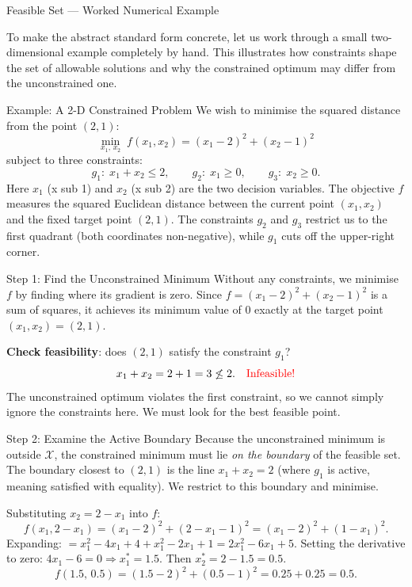 \documentclass[aspectratio=169,10pt]{beamer}
\begin{document}
\begin{frame}[allowframebreaks]{Feasible Set --- Worked Numerical Example}

To make the abstract standard form concrete, let us work through a small
two-dimensional example completely by hand.  This illustrates how constraints
shape the set of allowable solutions and why the constrained optimum may differ
from the unconstrained one.

  \begin{exampleblock}{Example: A 2-D Constrained Problem}
    We wish to minimise the squared distance from the point $(2, 1)$:
    \[
      \min_{x_1,\, x_2} \; f(x_1, x_2) = (x_1 - 2)^2 + (x_2 - 1)^2
    \]
    subject to three constraints:
    \[
      g_1:\; x_1 + x_2 \leq 2, \qquad
      g_2:\; x_1 \geq 0, \qquad
      g_3:\; x_2 \geq 0.
    \]
    Here $x_1$ (x sub 1) and $x_2$ (x sub 2) are the two decision variables.
    The objective $f$ measures the squared Euclidean distance between the
    current point $(x_1, x_2)$ and the fixed target point $(2, 1)$.
    The constraints $g_2$ and $g_3$ restrict us to the first quadrant (both
    coordinates non-negative), while $g_1$ cuts off the upper-right corner.
  \end{exampleblock}

  \begin{block}{Step 1: Find the Unconstrained Minimum}
    Without any constraints, we minimise $f$ by finding where its gradient
    is zero.  Since $f = (x_1-2)^2 + (x_2-1)^2$ is a sum of squares, it achieves
    its minimum value of $0$ exactly at the target point $(x_1, x_2) = (2, 1)$.

    \medskip
    \textbf{Check feasibility}: does $(2, 1)$ satisfy the constraint $g_1$?
    \[
      x_1 + x_2 = 2 + 1 = 3 \not\leq 2. \quad \text{\textcolor{red}{Infeasible!}}
    \]
    The unconstrained optimum violates the first constraint, so we cannot
    simply ignore the constraints here.  We must look for the best feasible point.
  \end{block}

  \begin{block}{Step 2: Examine the Active Boundary}
    Because the unconstrained minimum is outside $\mathcal{X}$, the constrained
    minimum must lie \emph{on the boundary} of the feasible set.  The boundary
    closest to $(2,1)$ is the line $x_1 + x_2 = 2$ (where $g_1$ is active,
    meaning satisfied with equality).  We restrict to this boundary and minimise.

    \medskip
    Substituting $x_2 = 2 - x_1$ into $f$:
    \[
      f(x_1, 2-x_1) = (x_1-2)^2 + (2-x_1-1)^2 = (x_1-2)^2 + (1-x_1)^2.
    \]
    Expanding: $= x_1^2 - 4x_1 + 4 + x_1^2 - 2x_1 + 1 = 2x_1^2 - 6x_1 + 5$.
    Setting the derivative to zero: $4x_1 - 6 = 0 \Rightarrow x_1^* = 1.5$.
    Then $x_2^* = 2 - 1.5 = 0.5$.
    \[
      f(1.5,\, 0.5) = (1.5-2)^2 + (0.5-1)^2 = 0.25 + 0.25 = 0.5.
    \]
  \end{block}


\end{frame}
\end{document}
